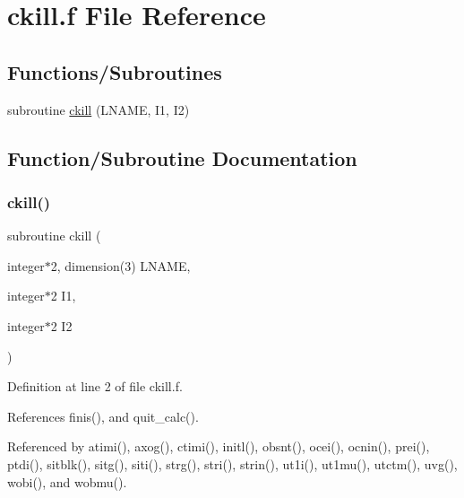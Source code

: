 \hypertarget{ckill_8f}{}\section{ckill.\+f File Reference}
\label{ckill_8f}
\subsection*{Functions/\+Subroutines}
\begin{DoxyCompactItemize}
\item 
subroutine \hyperlink{ckill_8f_afa254e765dcc710876177c91bc0252ef}{ckill} (L\+N\+A\+ME, I1, I2)
\end{DoxyCompactItemize}


\subsection{Function/\+Subroutine Documentation}
\mbox{\label{ckill_8f_afa254e765dcc710876177c91bc0252ef}} 
\subsubsection{\texorpdfstring{ckill()}{ckill()}}
{\footnotesize\ttfamily subroutine ckill (\begin{DoxyParamCaption}\item[{integer$\ast$2, dimension(3)}]{L\+N\+A\+ME,  }\item[{integer$\ast$2}]{I1,  }\item[{integer$\ast$2}]{I2 }\end{DoxyParamCaption})}



Definition at line 2 of file ckill.\+f.



References finis(), and quit\+\_\+calc().



Referenced by atimi(), axog(), ctimi(), initl(), obsnt(), ocei(), ocnin(), prei(), ptdi(), sitblk(), sitg(), siti(), strg(), stri(), strin(), ut1i(), ut1mu(), utctm(), uvg(), wobi(), and wobmu().


